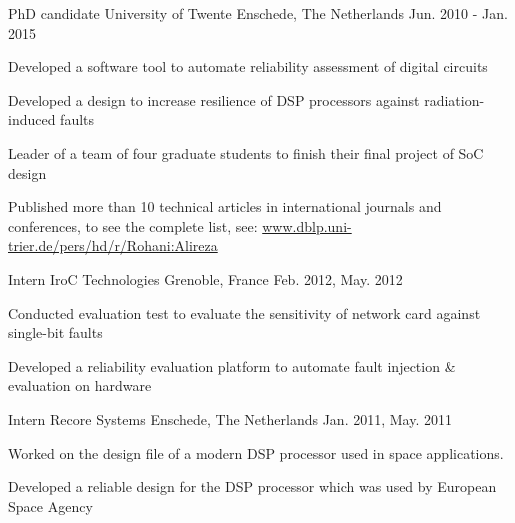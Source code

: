 \begin{cventries}
  \cventry
    {PhD candidate} %
    {University of Twente} %
    {Enschede, The Netherlands} %
    {Jun. 2010 - Jan. 2015} %
    {
      \begin{cvitems} %
	\item {Developed a software tool to automate reliability assessment of digital circuits}
        \item {Developed a design to increase resilience of DSP processors against radiation-induced faults}
        \item {Leader of a team of four graduate students to finish their final project of SoC design}
	\item{Published more than 10 technical articles in international journals and conferences, to see the complete list, see: \newline \href{www.dblp.uni-trier.de/pers/hd/r/Rohani:Alireza} {www.dblp.uni-trier.de/pers/hd/r/Rohani:Alireza}}
      \end{cvitems}
    }

  \cventry
    {Intern} %
    {IroC Technologies} %
    {Grenoble, France} %
    {Feb. 2012, May. 2012} %
    {
      \begin{cvitems} %
        \item {Conducted evaluation test to evaluate the sensitivity of network card against single-bit faults}
        \item {Developed a reliability evaluation platform to automate fault injection \&  evaluation on hardware}
	\end{cvitems}
	}
  \cventry
    {Intern} %
    {Recore Systems} %
    {Enschede, The Netherlands} %
    {Jan. 2011, May. 2011} %
    {
      \begin{cvitems} %
        \item {Worked on the design file of a modern DSP processor used in space applications.}
        \item {Developed a reliable design for the DSP processor which was used by European Space Agency}
      \end{cvitems}
    }

\end{cventries}
